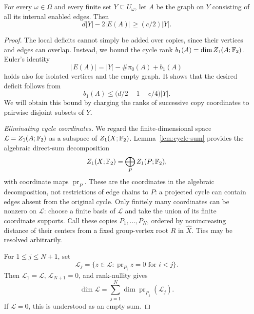 \begin{lemma}
\label{lem:global-deficit}
For every $\omega\in\Omega$ and every finite set $Y\subseteq U_\omega$,
let $A$ be the graph on $Y$ consisting of all its internal enabled edges.
Then
\begin{equation}
 d|Y|-2|E(A)|\ge(c/2)|Y|.
 \label{eq:global-deficit}
\end{equation}
\end{lemma}

\begin{proof}
The local deficits cannot simply be added over copies, since their
vertices and edges can overlap.  Instead, we bound the cycle rank
$b_1(A)=\dim Z_1(A;\mathbb F_2)$.  Euler's identity
\[
 |E(A)|=|Y|-\#\pi_0(A)+b_1(A)
\]
holds also for isolated vertices and the empty graph.  It shows that
the desired deficit follows from
\[
 b_1(A)\le\bigl(d/2-1-c/4\bigr)|Y|.
\]
We will obtain this bound by charging the ranks of successive copy
coordinates to pairwise disjoint subsets of $Y$.

\emph{Eliminating cycle coordinates.}
We regard the finite-dimensional space
$\mathcal L=Z_1(A;\mathbb F_2)$ as a subspace of $Z_1(X;\mathbb F_2)$.
Lemma~\ref{lem:cycle-sum} provides the algebraic direct-sum decomposition
\[
 Z_1(X;\mathbb F_2)=\bigoplus_P Z_1(P;\mathbb F_2),
\]
with coordinate maps $\operatorname{pr}_P$.  These are the coordinates
in the algebraic decomposition, not restrictions of edge chains to $P$:
a projected cycle can contain edges absent from the original cycle.
Only finitely many
coordinates can be nonzero on $\mathcal L$: choose a finite basis of
$\mathcal L$ and take the union of its finite coordinate supports.
Call these copies $P_1,\ldots,P_N$, ordered by nonincreasing distance
of their centers from a fixed group-vertex root $R$ in $\widehat X$.
Ties may be resolved arbitrarily.

For $1\le j\le N+1$, set
\[
 \mathcal L_j=
 \{z\in\mathcal L:\operatorname{pr}_{P_i}z=0\text{ for }i<j\}.
\]
Then $\mathcal L_1=\mathcal L$, $\mathcal L_{N+1}=0$, and rank-nullity
gives
\begin{equation}
 \dim\mathcal L=
 \sum_{j=1}^N\dim\operatorname{pr}_{P_j}(\mathcal L_j).
 \label{eq:cycle-elimination}
\end{equation}
If $\mathcal L=0$, this is understood as an empty sum.


\end{proof}
